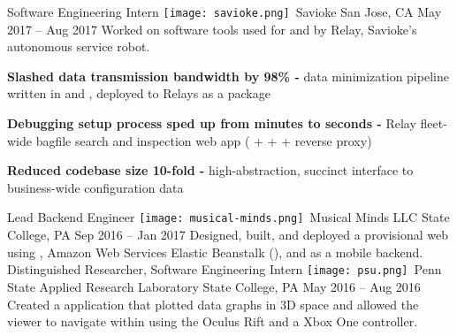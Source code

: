 \begin{cventries}
  \cventry
    {Software Engineering Intern}
    {\texttt{[image: savioke.png]}\, Savioke}
    {San Jose, CA}
    {May 2017 – Aug 2017}
    {Worked on software tools used for and by Relay, Savioke's autonomous service robot.}
    {
      \begin{cvitems}
        \item{\textbf{Slashed data transmission bandwidth by 98\% -}  data minimization pipeline written in  and , deployed to Relays as a  package}
        \item{\textbf{Debugging setup process sped up from minutes to seconds -} Relay fleet-wide bagfile search and inspection web app ( +  +  +  reverse proxy)}
        \item{\textbf{Reduced codebase size 10-fold -} high-abstraction, succinct  interface to business-wide configuration data}
      \end{cvitems}
    }
  \cventryNoBullets
    {Lead Backend Engineer}
    {\texttt{[image: musical-minds.png]}\, Musical Minds LLC}
    {State College, PA}
    {Sep 2016 – Jan 2017}
    {Designed, built, and deployed a provisional web  using , Amazon Web Services Elastic Beanstalk (), and  as a mobile backend.}
  \cventryNoBullets
    {Distinguished Researcher, Software Engineering Intern}
    {\texttt{[image: psu.png]}\, Penn State Applied Research Laboratory}
    {State College, PA}
    {May 2016 – Aug 2016}
    {Created a  application that plotted data graphs in 3D  space and allowed the viewer to navigate within using the Oculus Rift and a Xbox One controller.}
\end{cventries}
